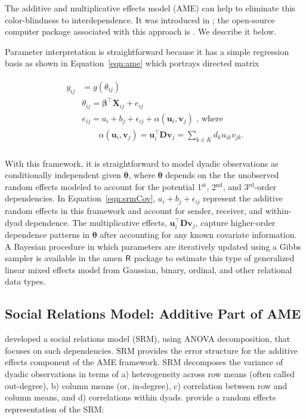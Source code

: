 \documentclass[12pt]{amsart}
\newcommand{\first}{1$^{\text{st}}$}
\newcommand{\second}{2$^{\text{nd}}$}
\newcommand{\third}{3$^{\text{rd}}$}
\newcommand{\pkg}[1]{{\fontseries{b}\selectfont #1}}
\begin{document}
The additive and multiplicative effects model (AME) can help to eliminate this color-blindness to interdependence. It was introduced in \cite{hoff:2008}; the open-source computer package associated with this approach is \cite{amenpkg}. We describe it below.

Parameter interpretation is straightforward because it has a simple regression basis as shown in Equation~\ref{eqn:ame} which portrays directed matrix \:

\begin{align}
\begin{aligned}
	y_{ij} &= g(\theta_{ij}) \\
	&\theta_{ij} = \bm\beta^{\top} \mathbf{X}_{ij} + e_{ij} \\
	&e_{ij} = a_{i} + b_{j}  + \epsilon_{ij} + \alpha(\textbf{u}_{i}, \textbf{v}_{j}) \text{  , where } \\
	&\qquad \alpha(\textbf{u}_{i}, \textbf{v}_{j}) = \textbf{u}_{i}^{\top} \textbf{D} \textbf{v}_{j} = \sum_{k \in K} d_{k} u_{ik} v_{jk}. \\
\label{eqn:ame}
\end{aligned}
\end{align}

With this framework, it is straightforward to model dyadic observations as conditionally independent given $\bm\theta$, where $\bm\theta$ depends on the the unobserved random effects modeled to account for the potential \first, \second, and \third-order dependencies. In Equation~\ref{eqn:srmCov}, $a_{i} + b_{j}  + \epsilon_{ij}$ represent the additive random effects in this framework and account for sender, receiver, and within-dyad dependence. The multiplicative effects, $\textbf{u}_{i}^{\top} \textbf{D} \textbf{v}_{j}$, capture higher-order dependence patterns in $\bm\theta$ after accounting for any known covariate information. A Bayesian procedure in which parameters are iteratively updated using a Gibbs sampler is available in the \pkg{amen} $\sf{R}$ package to estimate this type of generalized linear mixed effects model from Gaussian, binary, ordinal, and other relational data types.

\subsection{\textbf{Social Relations Model: Additive Part of AME}}

\citet{warner:etal:1979} developed a social relations model (SRM), using ANOVA decomposition, that focuses on such dependencies. SRM provides the error structure for the additive effects component of the AME framework. SRM decomposes the variance of dyadic observations in terms of a) heterogeneity across row means (often called out-degree), b) column means (or, in-degree), c) correlation between row and column means, and d) correlations within dyads.  \citet{wong:1982,li:loken:2002} provide a random effects representation of the SRM:
\end{document}
